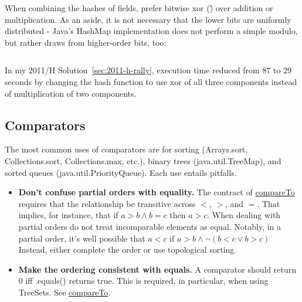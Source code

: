 \begin{itemize}
When combining the hashes of fields, prefer bitwise xor (\^) over addition
or multiplication.  As an aside, it is not necessary that the lower bits are uniformly distributed -
Java's HashMap implementation does not perform a simple modulo, but rather draws
from higher-order bits, too:

\inputminted[fontsize=\footnotesize,linenos=true]{java}{code/javautilHashMap.java}

In my 2011/H Solution~\ref{sec:2011-h-rally}, execution time reduced from 87 to 29 
seconds by changing the hash function to use xor of all three components instead 
of multiplication of two components.

\end{itemize}

\subsection{Comparators}
\label{sec:comparators}

The most common uses of comparators are for sorting (Arrays.sort, Collections.sort, Collections.max, etc.), 
binary trees (java.util.TreeMap), and sorted queues (java.util.PriorityQueue).
Each use entails pitfalls.

\begin{itemize}
\item \textbf{Don't confuse partial orders with equality.}
    The contract of
    \href{http://docs.oracle.com/javase/6/docs/api/java/lang/Comparable.html#compareTo(T)}{compareTo}
    requires that the relationship be transitive across $<$, $>$, and $=$.  That implies, for instance, 
    that if $a > b \land b = c$ then $a > c$.
    When dealing with partial orders do not treat incomparable elements as equal.  Notably,
    in a partial order, it's well possible that $a < c$ if $a > b \land \lnot (b < c \lor b > c)$
    Instead, either complete the order or use topological sorting.

\item \textbf{Make the ordering consistent with equals.}
    A comparator should return 0 iff .equals() returns true.   This is required, in particular, when
    using TreeSets.  See \href{http://docs.oracle.com/javase/6/docs/api/java/lang/Comparable.html#compareTo(T)}{compareTo}.

\end{itemize}
